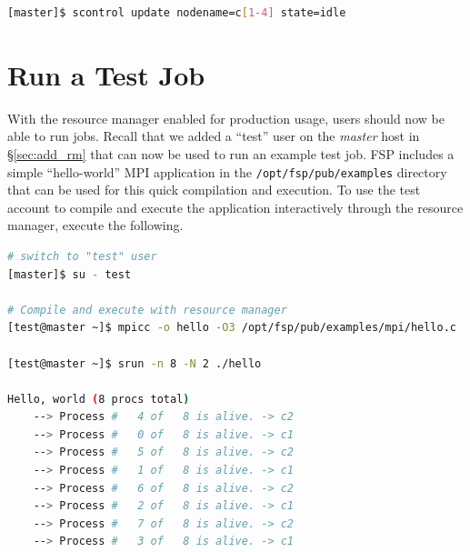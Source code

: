 \documentclass[letterpaper]{article}
\begin{document}

\begin{lstlisting}[language=bash]
[master]$ scontrol update nodename=c[1-4] state=idle
\end{lstlisting}


\section{Run a Test Job}

With the resource manager enabled for production usage, users should now be
able to run jobs. 
Recall that we added a ``test'' user on the {\em master} host in
\S\ref{sec:add_rm} that can now be used to run an example test job.  FSP
includes a simple ``hello-world'' MPI application in the
\texttt{/opt/fsp/pub/examples} directory that can be used for this quick
compilation and execution.  To use the test account to compile and execute the 
application interactively through the resource manager, execute the following.

\begin{lstlisting}[language=bash,keywords={}]
# switch to "test" user
[master]$ su - test

# Compile and execute with resource manager
[test@master ~]$ mpicc -o hello -O3 /opt/fsp/pub/examples/mpi/hello.c

[test@master ~]$ srun -n 8 -N 2 ./hello

Hello, world (8 procs total)
    --> Process #   4 of   8 is alive. -> c2
    --> Process #   0 of   8 is alive. -> c1
    --> Process #   5 of   8 is alive. -> c2
    --> Process #   1 of   8 is alive. -> c1
    --> Process #   6 of   8 is alive. -> c2
    --> Process #   2 of   8 is alive. -> c1
    --> Process #   7 of   8 is alive. -> c2
    --> Process #   3 of   8 is alive. -> c1
\end{lstlisting}
\end{document}
